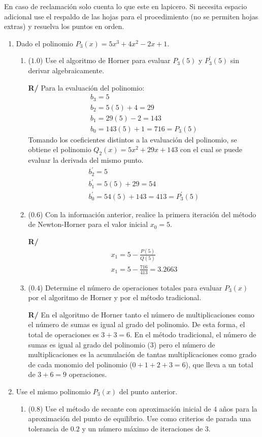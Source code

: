 \documentclass[12pt]{article}
\begin{document}
En caso de reclamación solo cuenta lo que este en lapicero. %
Si necesita espacio adicional %
use el respaldo de las hojas para el procedimiento (no se permiten hojas extras) y resuelva los puntos en orden. %
\vspace{-.5cm}
  \begin{enumerate}[leftmargin=*,widest=9]
    \item Dado el polinomio \(P_3(x) = 5x^3 + 4x^2 -2x +1\).
   \begin{enumerate}[label=\alph*]
    \item (\(1.0\)) Use el algoritmo de Horner para evaluar \(P_3(5)\) y \(P_3^\prime(5)\) sin derivar algebraicamente.

\textbf{R/}
    Para la evaluación del polinomio:
    \begin{eqnarray*}
    b_3 = 5\\
    b_2 = 5(5) + 4 = 29\\
    b_1 = 29(5) - 2 = 143\\
    b_0 = 143(5) + 1 = 716 = P_3(5)
    \end{eqnarray*}
    Tomando los coeficientes distintos a la evaluación del polinomio, se obtiene el polinomio \(Q_2(x) = 5x^2 +29x+143\) con el cual se puede evaluar la derivada del mismo punto.
    \begin{eqnarray*}
    b^{\prime}_2 = 5\\
    b^{\prime}_1 = 5(5) + 29 = 54\\
    b^{\prime}_0 = 54(5) + 143 = 413 = P_3^{\prime}(5)
    \end{eqnarray*}
    \item (\(0.6\)) Con la información anterior, realice la primera iteración del método de Newton-Horner para el valor inicial \(x_0=5\).

\textbf{R/}
    \begin{eqnarray*}
    x_1 = 5 - \frac{P(5)}{Q(5)}\\
    x_1 = 5 - \frac{716}{413} = 3.2663
    \end{eqnarray*}
    \item (\(0.4\)) Determine el número de operaciones totales para evaluar \(P_3(x)\) por el algoritmo de Horner y por el método tradicional.

\textbf{R/} En el algoritmo de Horner tanto el número de multiplicaciones como el número de sumas es igual al grado del polinomio. De esta forma, el total de operaciones es \(3+3=6\).
    En el método tradicional, el número de sumas es igual al grado del polinomio (\(3\)) pero el número de multiplicaciones es la acumulación de tantas multiplicaciones como grado de cada monomio del polinomio (\(0 + 1 + 2 + 3 = 6 \)), que lleva a un total de \(3+6=9\) operaciones.
    \end{enumerate}
    \item Use el mismo polinomio \(P_3(x)\) del punto anterior.
    \begin{enumerate}[label=\alph*]
    \item (\(0.8\)) Use el método de secante con aproximación inicial de \(4\) años para la aproximación del punto de equilibrio. Use como criterios de parada una tolerancia de \(0.2\) y un número máximo de iteraciones de 3.


\end{enumerate}
\end{enumerate}
\end{document}

